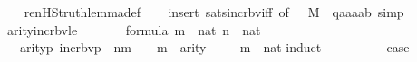 \begin{isabellebody}
%
\isadelimproof
\ \ %
\endisadelimproof
%
\isatagproof
{}\isamarkupfalse%
\ ren{\isacharunderscore}{\kern0pt}HS{\isacharunderscore}{\kern0pt}truth{\isacharunderscore}{\kern0pt}lemma{\isacharunderscore}{\kern0pt}def\isanewline
\ \ \isamarkupfalse%
\ {\isacharparenleft}{\kern0pt}insert\ sats{\isacharunderscore}{\kern0pt}incr{\isacharunderscore}{\kern0pt}bv{\isacharunderscore}{\kern0pt}iff\ {\isacharbrackleft}{\kern0pt}of\ {\isacharunderscore}{\kern0pt}\ {\isacharunderscore}{\kern0pt}\ M\ {\isacharunderscore}{\kern0pt}\ {\isachardoublequoteopen}{\isacharbrackleft}{\kern0pt}q{\isacharcomma}{\kern0pt}a{}{\isacharcomma}{\kern0pt}a{}{\isacharcomma}{\kern0pt}a{}{\isacharcomma}{\kern0pt}a{}{\isacharcomma}{\kern0pt}b{\isacharbrackright}{\kern0pt}{\isachardoublequoteclose}{\isacharbrackright}{\kern0pt}{\isacharcomma}{\kern0pt}\ simp{\isacharparenright}{\kern0pt}%
\endisatagproof
{\isafoldproof}%
%
\isadelimproof
\isanewline
%
\endisadelimproof
\isanewline
{}\isamarkupfalse%
\ arity{\isacharunderscore}{\kern0pt}incr{\isacharunderscore}{\kern0pt}bv{\isacharunderscore}{\kern0pt}le\ {\isacharcolon}{\kern0pt}\ \isanewline
\ \ \ {\isachardoublequoteopen}{\isasymphi}\ {\isasymin}\ formula{\isachardoublequoteclose}\ {\isachardoublequoteopen}m\ {\isasymin}\ nat{\isachardoublequoteclose}\ {\isachardoublequoteopen}n\ {\isasymin}\ nat{\isachardoublequoteclose}\isanewline
\ \ \ {\isachardoublequoteopen}arity{\isacharparenleft}{\kern0pt}{\isacharparenleft}{\kern0pt}{\isasymlambda}p{\isachardot}{\kern0pt}\ incr{\isacharunderscore}{\kern0pt}bv{\isacharparenleft}{\kern0pt}p{\isacharparenright}{\kern0pt}\ {\isacharbackquote}{\kern0pt}\ n{\isacharparenright}{\kern0pt}{\isacharcircum}{\kern0pt}m\ {\isacharparenleft}{\kern0pt}{\isasymphi}{\isacharparenright}{\kern0pt}\ {\isacharparenright}{\kern0pt}\ {\isasymle}\ m\ {\isacharhash}{\kern0pt}{\isacharplus}{\kern0pt}\ arity{\isacharparenleft}{\kern0pt}{\isasymphi}{\isacharparenright}{\kern0pt}{\isachardoublequoteclose}\ \isanewline
%
\isadelimproof
\ \ %
\endisadelimproof
%
\isatagproof
{}\isamarkupfalse%
\ {\isacartoucheopen}m\ {\isasymin}\ nat{\isacartoucheclose}\isanewline
{}\isamarkupfalse%
{\isacharparenleft}{\kern0pt}induct{\isacharparenright}{\kern0pt}\isanewline
\ \ \isamarkupfalse%
\ {}\isanewline
\ \ \isamarkupfalse%
\ \isamarkupfalse%
\ {\isacharquery}{\kern0pt}case\ \isamarkupfalse%

\end{isabellebody}
